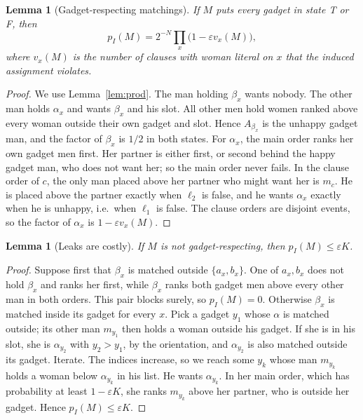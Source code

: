 \documentclass[11pt]{article}
\newtheorem{lemma}[theorem]{Lemma}
\theoremstyle{definition}
\begin{document}
\begin{lemma}[Gadget-respecting matchings]\label{lem:resp}
If $M$ puts every gadget in state T or F, then
\[
p_I(M)=2^{-N}\prod_x\bigl(1-\varepsilon v_x(M)\bigr),
\]
where $v_x(M)$ is the number of clauses with woman literal on $x$ that the induced assignment violates.
\end{lemma}
\begin{proof}
We use Lemma~\ref{lem:prod}. The man holding $\beta_x$ wants nobody. The other man holds $\alpha_x$ and wants
$\beta_x$ and his slot. All other men hold women ranked above every woman outside their own gadget and slot.
Hence $A_{\beta_x}$ is the unhappy gadget man, and the factor of $\beta_x$ is $1/2$ in both states.
For $\alpha_x$, the main order ranks her own gadget men first. Her partner is either first, or second behind the happy gadget man,
who does not want her; so the main order never fails. In the clause order of $c$, the only man placed above her partner
who might want her is $m_c$. He is placed above the partner exactly when $\ell_2$ is false, and he wants $\alpha_x$ exactly
when he is unhappy, i.e.\ when $\ell_1$ is false. The clause orders are disjoint events, so the factor of $\alpha_x$ is
$1-\varepsilon v_x(M)$.
\end{proof}

\begin{lemma}[Leaks are costly]\label{lem:leak}
If $M$ is not gadget-respecting, then $p_I(M)\le\varepsilon K$.
\end{lemma}
\begin{proof}
Suppose first that $\beta_x$ is matched outside $\{a_x,b_x\}$. One of $a_x,b_x$ does not hold $\beta_x$ and ranks her first,
while $\beta_x$ ranks both gadget men above every other man in both orders. This pair blocks surely, so $p_I(M)=0$.
Otherwise $\beta_x$ is matched inside its gadget for every $x$. Pick a gadget $y_1$ whose $\alpha$ is matched outside;
its other man $m_{y_1}$ then holds a woman outside his gadget. If she is in his slot, she is $\alpha_{y_2}$ with $y_2>y_1$, by
the orientation, and $\alpha_{y_2}$ is also matched outside its gadget. Iterate. The indices increase, so we reach some $y_k$
whose man $m_{y_k}$ holds a woman below $\alpha_{y_k}$ in his list. He wants $\alpha_{y_k}$. In her main order, which has
probability at least $1-\varepsilon K$, she ranks $m_{y_k}$ above her partner, who is outside her gadget. Hence
$p_I(M)\le\varepsilon K$.
\end{proof}
\end{document}
